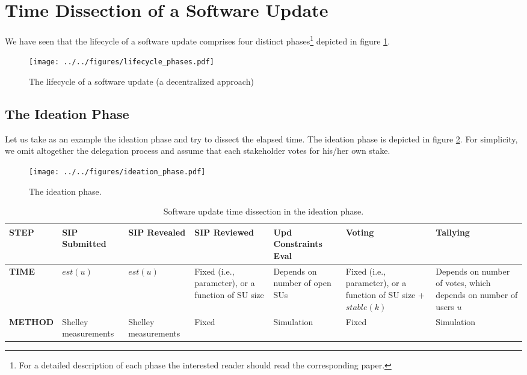 \section{Time Dissection of a Software Update}
We have seen that the lifecycle of a software update comprises four distinct phases\footnote{For a detailed description of each phase the interested reader should read the corresponding paper.} depicted in figure \ref{lifecycle}.

\begin{figure}[h!]
    \caption{The lifecycle of a software update (a decentralized approach)}
    \centering
    \texttt{[image: ../../figures/lifecycle\_phases.pdf]}
    \label{lifecycle}
\end{figure}


\subsection{The Ideation Phase}
Let us take as an example the ideation phase and try to dissect the elapsed time. The ideation phase is depicted in figure \ref{ideation}. For simplicity, we omit altogether the delegation process and assume that each stakeholder votes for his/her own stake.

\begin{figure}[h!]
    \caption{The ideation phase.}
    \centering
    \texttt{[image: ../../figures/ideation\_phase.pdf]}
    \label{ideation}
\end{figure}

\begin{table} [h!]
\centering
\begin{tabu} to 1.0\textwidth {||X[c] | X[c] | X[l] | X[l] | X[l] | X[l] | X[l] ||}
\hline
\textbf{STEP} & SIP Submitted & SIP Revealed & SIP Reviewed & Upd Constraints Eval & Voting & Tallying \\
\hline
\hline
\textbf{TIME} & $est(u)$ & $est(u)$ & Fixed (i.e., parameter), or a function of SU size & Depends on number of open SUs & Fixed (i.e., parameter), or a function of SU size + $stable(k)$ & Depends on number of votes, which depends on number of users $u$ \\
\hline 
\textbf{METHOD} & Shelley measurements & Shelley measurements & Fixed & Simulation & Fixed & Simulation \\
\hline
\end{tabu}
\caption{Software update time dissection in the ideation phase.}
\label{ideation_dis}
\end{table}

